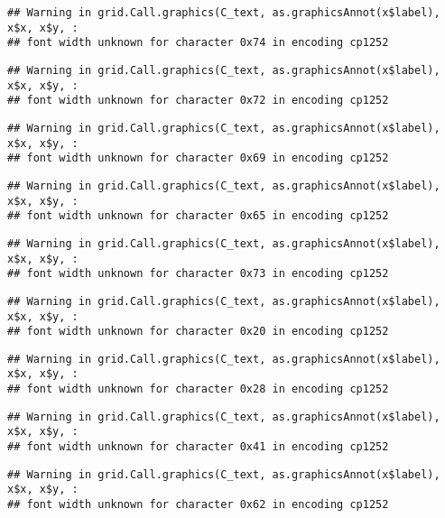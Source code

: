 \documentclass[
]{article}
\begin{document}
\begin{verbatim}
## Warning in grid.Call.graphics(C_text, as.graphicsAnnot(x$label), x$x, x$y, :
## font width unknown for character 0x74 in encoding cp1252
\end{verbatim}

\begin{verbatim}
## Warning in grid.Call.graphics(C_text, as.graphicsAnnot(x$label), x$x, x$y, :
## font width unknown for character 0x72 in encoding cp1252
\end{verbatim}

\begin{verbatim}
## Warning in grid.Call.graphics(C_text, as.graphicsAnnot(x$label), x$x, x$y, :
## font width unknown for character 0x69 in encoding cp1252
\end{verbatim}

\begin{verbatim}
## Warning in grid.Call.graphics(C_text, as.graphicsAnnot(x$label), x$x, x$y, :
## font width unknown for character 0x65 in encoding cp1252
\end{verbatim}

\begin{verbatim}
## Warning in grid.Call.graphics(C_text, as.graphicsAnnot(x$label), x$x, x$y, :
## font width unknown for character 0x73 in encoding cp1252
\end{verbatim}

\begin{verbatim}
## Warning in grid.Call.graphics(C_text, as.graphicsAnnot(x$label), x$x, x$y, :
## font width unknown for character 0x20 in encoding cp1252
\end{verbatim}

\begin{verbatim}
## Warning in grid.Call.graphics(C_text, as.graphicsAnnot(x$label), x$x, x$y, :
## font width unknown for character 0x28 in encoding cp1252
\end{verbatim}

\begin{verbatim}
## Warning in grid.Call.graphics(C_text, as.graphicsAnnot(x$label), x$x, x$y, :
## font width unknown for character 0x41 in encoding cp1252
\end{verbatim}

\begin{verbatim}
## Warning in grid.Call.graphics(C_text, as.graphicsAnnot(x$label), x$x, x$y, :
## font width unknown for character 0x62 in encoding cp1252
\end{verbatim}
\end{document}

